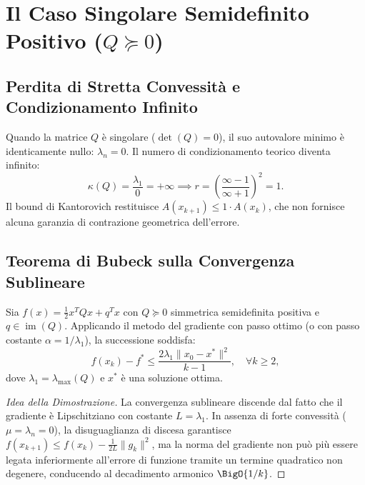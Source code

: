 \FloatBarrier
\section[Il Caso Singolare Semidefinito Positivo (Q >= 0)]{Il Caso Singolare Semidefinito Positivo ($Q \succeq 0$)}
\label{sec:caso-singolare-semidefinito}

\subsection{Perdita di Stretta Convessit\`a e Condizionamento Infinito}
Quando la matrice $Q$ \`e singolare ($\det(Q) = 0$), il suo autovalore minimo \`e identicamente nullo: $\lambda_n = 0$. Il numero di condizionamento teorico diventa infinito:
\begin{equation}
    \kappa(Q) = \frac{\lambda_1}{0} = +\infty \implies r = \left( \frac{\infty - 1}{\infty + 1} \right)^2 = 1.
\end{equation}
Il bound di Kantorovich restituisce $A(x_{k+1}) \le 1 \cdot A(x_k)$, che non fornisce alcuna garanzia di contrazione geometrica dell'errore.

\subsection{Teorema di Bubeck sulla Convergenza Sublineare}

\begin{theorem}
\label{thm:bubeck-sublineare}
Sia $f(x) = \frac{1}{2} x^T Q x + q^T x$ con $Q \succeq 0$ simmetrica semidefinita positiva e $q \in \operatorname{im}(Q)$. Applicando il metodo del gradiente con passo ottimo (o con passo costante $\alpha = 1/\lambda_1$), la successione soddisfa:
\begin{equation}
    f(x_k) - f^* \le \frac{2 \lambda_1 \|x_0 - x^*\|^2}{k - 1}, \quad \forall k \ge 2,
    \label{eq:bubeck-bound}
\end{equation}
dove $\lambda_1 = \lambda_{\max}(Q)$ e $x^*$ \`e una soluzione ottima.
\end{theorem}

\begin{proof}[Idea della Dimostrazione]
La convergenza sublineare discende dal fatto che il gradiente \`e Lipschitziano con costante $L = \lambda_1$. In assenza di forte convessit\`a ($\mu = \lambda_n = 0$), la disuguaglianza di discesa garantisce $f(x_{k+1}) \le f(x_k) - \frac{1}{2L} \|g_k\|^2$, ma la norma del gradiente non pu\`o pi\`u essere legata inferiormente all'errore di funzione tramite un termine quadratico non degenere, conducendo al decadimento armonico $\BigO{1/k}$.
\end{proof}

